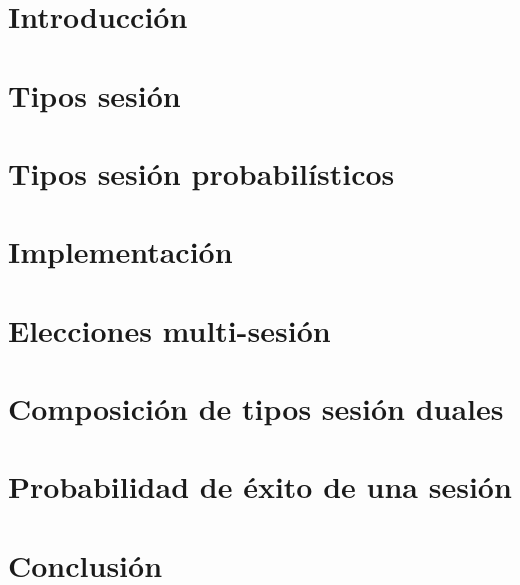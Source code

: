 \documentclass[11pt,a4paper]{tesis}
\begin{document}

\def\autor{Iván Pondal}
\def\tituloTesis{Inferencia de tipos sesión probabilísticos}
\def\runtitulo{Inferencia de tipos sesión probabilísticos}
\def\director{Hernán Melgratti}
\def\lugar{Buenos Aires, 2021}



\frontmatter
\pagestyle{empty}


%
%
%

\cleardoublepage
\tableofcontents


\mainmatter
\pagestyle{headings}


\chapter{Introducción}



\chapter{Tipos sesión}





\chapter{Tipos sesión probabilísticos}





\chapter{Implementación}



\chapter{Elecciones multi-sesión}



\chapter{Composición de tipos sesión duales}



\chapter{Probabilidad de éxito de una sesión}



\chapter{Conclusión}




\backmatter


\end{document}
